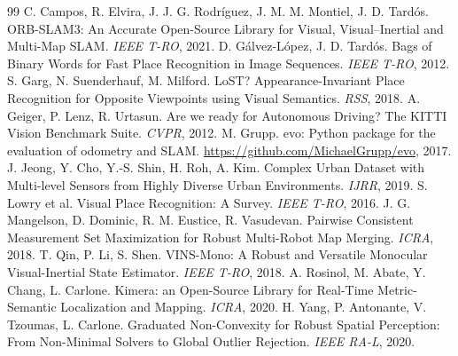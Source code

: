 \documentclass[11pt,a4paper]{article}
\begin{document}
\begin{thebibliography}{99}\small
{} C. Campos, R. Elvira, J. J. G. Rodríguez, J. M. M. Montiel, J. D. Tardós.
  ORB-SLAM3: An Accurate Open-Source Library for Visual, Visual--Inertial and Multi-Map SLAM. \emph{IEEE T-RO}, 2021.
 D. Gálvez-López, J. D. Tardós. Bags of Binary Words for Fast Place Recognition in Image
  Sequences. \emph{IEEE T-RO}, 2012.
 S. Garg, N. Suenderhauf, M. Milford. LoST? Appearance-Invariant Place Recognition for Opposite
  Viewpoints using Visual Semantics. \emph{RSS}, 2018.
 A. Geiger, P. Lenz, R. Urtasun. Are we ready for Autonomous Driving? The KITTI Vision
  Benchmark Suite. \emph{CVPR}, 2012.
 M. Grupp. evo: Python package for the evaluation of odometry and SLAM.
  \url{https://github.com/MichaelGrupp/evo}, 2017.
 J. Jeong, Y. Cho, Y.-S. Shin, H. Roh, A. Kim. Complex Urban Dataset with Multi-level Sensors
  from Highly Diverse Urban Environments. \emph{IJRR}, 2019.
 S. Lowry et al. Visual Place Recognition: A Survey. \emph{IEEE T-RO}, 2016.
 J. G. Mangelson, D. Dominic, R. M. Eustice, R. Vasudevan. Pairwise Consistent Measurement
  Set Maximization for Robust Multi-Robot Map Merging. \emph{ICRA}, 2018.
 T. Qin, P. Li, S. Shen. VINS-Mono: A Robust and Versatile Monocular Visual-Inertial State
  Estimator. \emph{IEEE T-RO}, 2018.
 A. Rosinol, M. Abate, Y. Chang, L. Carlone. Kimera: an Open-Source Library for Real-Time
  Metric-Semantic Localization and Mapping. \emph{ICRA}, 2020.
 H. Yang, P. Antonante, V. Tzoumas, L. Carlone. Graduated Non-Convexity for Robust Spatial
  Perception: From Non-Minimal Solvers to Global Outlier Rejection. \emph{IEEE RA-L}, 2020.
\end{thebibliography}
\end{document}
